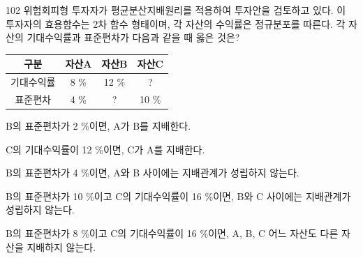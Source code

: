 \begin{question}{102}
위험회피형 투자자가 평균분산지배원리를 적용하여 투자안을 검토하고 있다. 이 투자자의 효용함수는 2차 함수 형태이며, 각 자산의 수익률은 정규분포를 따른다. 각 자산의 기대수익률과 표준편차가 다음과 같을 때 옳은 것은?
\par
{\small\centering
\begin{tabular}{|c|c|c|c|}\hline
구분 & 자산A & 자산B & 자산C \\ \hline
기대수익률 & 8 \% & 12 \% & ? \\ \hline
표준편차 & 4 \% & ? & 10 \% \\ \hline
\end{tabular}\par}
\begin{choices}
  \item B의 표준편차가 2 \%이면, A가 B를 지배한다.
  \item C의 기대수익률이 12 \%이면, C가 A를 지배한다.
  \item B의 표준편차가 4 \%이면, A와 B 사이에는 지배관계가 성립하지 않는다.
  \item B의 표준편차가 10 \%이고 C의 기대수익률이 16 \%이면, B와 C 사이에는 지배관계가 성립하지 않는다.
  \item B의 표준편차가 8 \%이고 C의 기대수익률이 16 \%이면, A, B, C 어느 자산도 다른 자산을 지배하지 않는다.
\end{choices}
\end{question}
